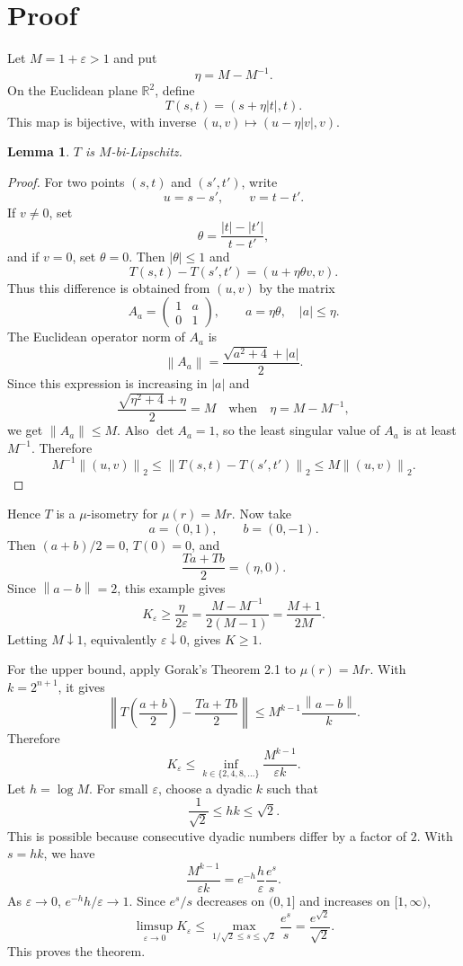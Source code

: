 \documentclass[11pt]{article}
\newtheorem{lemma}{Lemma}
\newcommand{\R}{\mathbb{R}}
\newcommand{\eps}{\varepsilon}
\newcommand{\norm}[1]{\left\lVert #1 \right\rVert}
\begin{document}
\section*{Proof}

Let \(M=1+\eps>1\) and put
\[
\eta=M-M^{-1}.
\]
On the Euclidean plane \(\R^2\), define
\[
T(s,t)=(s+\eta |t|,t).
\]
This map is bijective, with inverse \((u,v)\mapsto (u-\eta |v|,v)\).

\begin{lemma}
\(T\) is \(M\)-bi-Lipschitz.
\end{lemma}

\begin{proof}
For two points \((s,t)\) and \((s',t')\), write
\[
u=s-s',\qquad v=t-t'.
\]
If \(v\ne0\), set
\[
\theta=\frac{|t|-|t'|}{t-t'},
\]
and if \(v=0\), set \(\theta=0\).  Then \(|\theta|\le1\) and
\[
T(s,t)-T(s',t')=(u+\eta\theta v,v).
\]
Thus this difference is obtained from \((u,v)\) by the matrix
\[
A_a=\begin{pmatrix}1&a\\0&1\end{pmatrix},
\qquad a=\eta\theta,\quad |a|\le \eta .
\]
The Euclidean operator norm of \(A_a\) is
\[
\norm{A_a}=\frac{\sqrt{a^2+4}+|a|}{2}.
\]
Since this expression is increasing in \(|a|\) and
\[
\frac{\sqrt{\eta^2+4}+\eta}{2}=M
\quad\text{when}\quad \eta=M-M^{-1},
\]
we get \(\norm{A_a}\le M\).  Also \(\det A_a=1\), so the least singular value
of \(A_a\) is at least \(M^{-1}\).  Therefore
\[
M^{-1}\norm{(u,v)}_2\le \norm{T(s,t)-T(s',t')}_2\le M\norm{(u,v)}_2.
\]
\end{proof}

Hence \(T\) is a \(\mu\)-isometry for \(\mu(r)=Mr\).  Now take
\[
a=(0,1),\qquad b=(0,-1).
\]
Then \((a+b)/2=0\), \(T(0)=0\), and
\[
\frac{Ta+Tb}{2}=(\eta,0).
\]
Since \(\norm{a-b}=2\), this example gives
\[
K_\eps\ge \frac{\eta}{2\eps}
=\frac{M-M^{-1}}{2(M-1)}
=\frac{M+1}{2M}.
\]
Letting \(M\downarrow1\), equivalently \(\eps\downarrow0\), gives \(K\ge1\).

For the upper bound, apply Gorak's Theorem 2.1 to \(\mu(r)=Mr\).  With
\(k=2^{n+1}\), it gives
\[
\left\|T\left(\frac{a+b}{2}\right)-\frac{Ta+Tb}{2}\right\|
\le M^{k-1}\frac{\norm{a-b}}{k}.
\]
Therefore
\[
K_\eps\le \inf_{k\in\{2,4,8,\ldots\}}\frac{M^{k-1}}{\eps k}.
\]
Let \(h=\log M\).  For small \(\eps\), choose a dyadic \(k\) such that
\[
\frac1{\sqrt2}\le hk\le \sqrt2.
\]
This is possible because consecutive dyadic numbers differ by a factor of
\(2\).  With \(s=hk\), we have
\[
\frac{M^{k-1}}{\eps k}
=e^{-h}\frac{h}{\eps}\frac{e^s}{s}.
\]
As \(\eps\to0\), \(e^{-h}h/\eps\to1\).  Since \(e^s/s\) decreases on
\((0,1]\) and increases on \([1,\infty)\),
\[
\limsup_{\eps\to0}K_\eps
\le \max_{1/\sqrt2\le s\le \sqrt2}\frac{e^s}{s}
=\frac{e^{\sqrt2}}{\sqrt2}.
\]
This proves the theorem.
\end{document}
